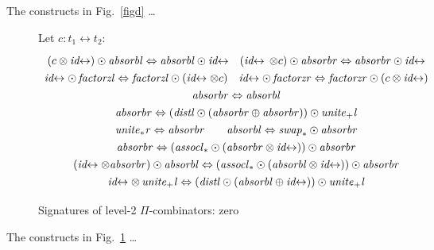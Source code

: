\documentclass{article}
\newcommand{\identlp}{\mathit{unite}_+\mathit{l}}
\newcommand{\identlst}{\mathit{unite}_*\mathit{r}}
\newcommand{\swapt}{\mathit{swap}_*}
\newcommand{\assoclt}{\mathit{assocl}_*}
\newcommand{\absorbr}{\mathit{absorbr}}
\newcommand{\absorbl}{\mathit{absorbl}}
\newcommand{\factorzr}{\mathit{factorzr}}
\newcommand{\factorzl}{\mathit{factorzl}}
\newcommand{\distl}{\mathit{distl}}
\newcommand{\idc}{\mathit{id}\!\!\leftrightarrow}
\begin{document}
The constructs in Fig.~\ref{figd} \ldots 
\begin{center}
\begin{tikzpicture}[scale=0.7,every node/.style={scale=0.8}]
\end{tikzpicture}
\end{center}


\begin{figure}[tb]
Let $c : t_1 \leftrightarrow t_2$:
\[\def\arraystretch{1.3}
\begin{array}{c}
  {(c \otimes \idc) \odot \absorbl \Leftrightarrow \absorbl \odot \idc}
\quad
  {(\idc \, \otimes c) \odot \absorbr \Leftrightarrow \absorbr \odot \idc}
\\
  {\idc \odot \, \factorzl \Leftrightarrow \factorzl \odot (\idc \otimes c)}
\quad
  {\idc \odot \, \factorzr \Leftrightarrow \factorzr \odot (c \otimes \idc)}
\\
  {\absorbr \Leftrightarrow \absorbl}
\\
  {\absorbr \Leftrightarrow (\distl \odot (\absorbr \oplus \absorbr)) \odot \identlp}
\\
  {\identlst \Leftrightarrow \absorbr}
\qquad
  {\absorbl \Leftrightarrow \swapt \odot \absorbr}
\\
  {\absorbr \Leftrightarrow (\assoclt \odot (\absorbr \otimes \idc)) \odot \absorbr}
\\
  {(\idc \otimes \absorbr) \odot \absorbl \Leftrightarrow (\assoclt \odot (\absorbl \otimes \idc)) \odot \absorbr}
\\
  {\idc \otimes \, \identlp \Leftrightarrow (\distl \odot (\absorbl \oplus \idc)) \odot \identlp}
\end{array}\]
\caption{\label{figc}Signatures of level-2 $\Pi$-combinators: zero}
\end{figure}

The constructs in Fig.~\ref{figc} \ldots 
\begin{center}
\begin{tikzpicture}[scale=0.7,every node/.style={scale=0.8}]
\end{tikzpicture}
\end{center}
\end{document}
